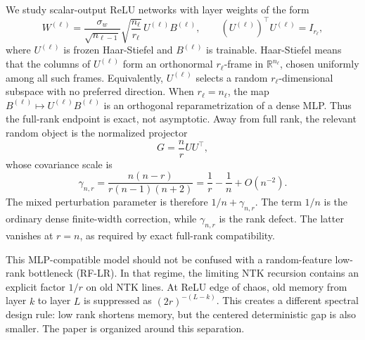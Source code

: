 \documentclass{article}
\newcommand{\R}{\mathbb R}
\begin{document}
We study scalar-output ReLU networks with layer weights of the form
\begin{equation}
W^{(\ell)}=\frac{\sigma_w}{\sqrt{n_{\ell-1}}}\sqrt{\frac{n_\ell}{r_\ell}}\,U^{(\ell)}B^{(\ell)},
\qquad (U^{(\ell)})^\top U^{(\ell)}=I_{r_\ell},
\label{eq:intro-model}
\end{equation}
where \(U^{(\ell)}\) is frozen Haar-Stiefel and \(B^{(\ell)}\) is trainable. Haar-Stiefel means that the columns of \(U^{(\ell)}\) form an orthonormal \(r_\ell\)-frame in \(\R^{n_\ell}\), chosen uniformly among all such frames. Equivalently, \(U^{(\ell)}\) selects a random \(r_\ell\)-dimensional subspace with no preferred direction. When \(r_\ell=n_\ell\), the map \(B^{(\ell)}\mapsto U^{(\ell)}B^{(\ell)}\) is an orthogonal reparametrization of a dense MLP. Thus the full-rank endpoint is exact, not asymptotic. Away from full rank, the relevant random object is the normalized projector
\begin{equation}
G=\frac nr UU^\top,
\label{eq:intro-G}
\end{equation}
whose covariance scale is
\begin{equation}
\gamma_{n,r}=\frac{n(n-r)}{r(n-1)(n+2)}=\frac1r-\frac1n+O(n^{-2}).
\label{eq:intro-gamma}
\end{equation}
The mixed perturbation parameter is therefore \(1/n+\gamma_{n,r}\). The term \(1/n\) is the ordinary dense finite-width correction, while \(\gamma_{n,r}\) is the rank defect. The latter vanishes at \(r=n\), as required by exact full-rank compatibility.

This MLP-compatible model should not be confused with a random-feature low-rank bottleneck (RF-LR). In that regime, the limiting NTK recursion contains an explicit factor \(1/r\) on old NTK lines. At ReLU edge of chaos, old memory from layer \(k\) to layer \(L\) is suppressed as \((2r)^{-(L-k)}\). This creates a different spectral design rule: low rank shortens memory, but the centered deterministic gap is also smaller. The paper is organized around this separation.
\end{document}
